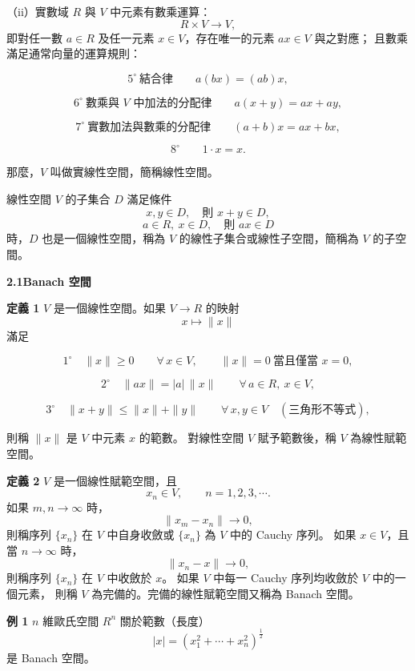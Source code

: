 \documentclass[11pt,a4paper,twoside]{article}
\newcommand{\pnum}[1]{%
    \makebox[0pt][r]{%
        \scriptsize\textbf{[#1]}\hspace{0.7em}%
    }%
}
\begin{document}
\noindent
（ii）實數域 $R$ 與 $V$ 中元素有數乘運算：
\[
    R\times V\longrightarrow V,
\]
即對任一數 $a\in R$ 及任一元素 $x\in V$，存在唯一的元素 $ax\in V$ 與之對應；
且數乘滿足通常向量的運算規則：

\[
    5^\circ\ \text{結合律}\qquad a(bx)=(ab)x,
\]

\[
    6^\circ\ \text{數乘與 }V\text{ 中加法的分配律}\qquad
    a(x+y)=ax+ay,
\]

\[
    7^\circ\ \text{實數加法與數乘的分配律}\qquad
    (a+b)x=ax+bx,
\]

\[
    8^\circ\qquad 1\cdot x=x.
\]

那麼，$V$ 叫做實線性空間，簡稱線性空間。

\noindent
\pnum{30}
線性空間 $V$ 的子集合 $D$ 滿足條件
\[
    x,y\in D,\quad \text{則 }x+y\in D,
\]
\[
    a\in R,\ x\in D,\quad \text{則 }ax\in D
\]
時，$D$ 也是一個線性空間，稱為 $V$ 的線性子集合或線性子空間，簡稱為 $V$ 的子空間。

\newpage

\noindent
\textbf{2.1\qquad Banach 空間}

\vspace{0.8em}

\noindent
\pnum{31}
\textbf{定義 1}\quad
$V$ 是一個線性空間。如果 $V\to R$ 的映射
\[
    x\longmapsto \|x\|
\]
滿足

\[
    1^\circ\quad
    \|x\|\ge 0\qquad \forall\,x\in V,
    \qquad
    \|x\|=0\ \text{當且僅當 }x=0,
\]

\[
    2^\circ\quad
    \|ax\|=|a|\,\|x\|
    \qquad
    \forall\,a\in R,\ x\in V,
\]

\[
    3^\circ\quad
    \|x+y\|\le \|x\|+\|y\|
    \qquad
    \forall\,x,y\in V
    \quad
    (\text{三角形不等式}),
\]

則稱 $\|x\|$ 是 $V$ 中元素 $x$ 的範數。
對線性空間 $V$ 賦予範數後，稱 $V$ 為線性賦範空間。

\noindent
\pnum{32}
\textbf{定義 2}\quad
$V$ 是一個線性賦範空間，且
\[
    x_n\in V,\qquad n=1,2,3,\cdots.
\]
如果 $m,n\to\infty$ 時，
\[
    \|x_m-x_n\|\to 0,
\]
則稱序列 $\{x_n\}$ 在 $V$ 中自身收斂或 $\{x_n\}$ 為 $V$ 中的 Cauchy 序列。
如果 $x\in V$，且當 $n\to\infty$ 時，
\[
    \|x_n-x\|\to 0,
\]
則稱序列 $\{x_n\}$ 在 $V$ 中收斂於 $x$。
如果 $V$ 中每一 Cauchy 序列均收斂於 $V$ 中的一個元素，
則稱 $V$ 為完備的。完備的線性賦範空間又稱為 Banach 空間。

\noindent
\pnum{33}
\textbf{例 1}\quad
$n$ 維歐氏空間 $R^n$ 關於範數（長度）
\[
    |x|
    =
    \left(
    x_1^2+\cdots+x_n^2
    \right)^{\frac12}
\]
是 Banach 空間。
\end{document}
